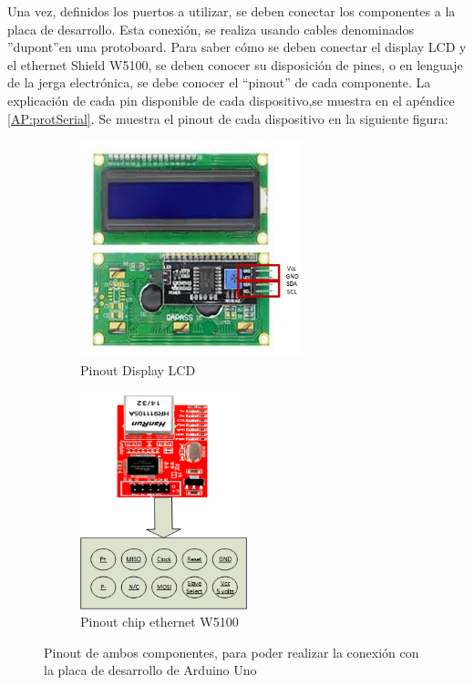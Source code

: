 Una vez, definidos los puertos a utilizar, se deben conectar los componentes a la placa de desarrollo. Esta conexión, se realiza usando cables denominados ''dupont''en una protoboard. 
Para saber cómo se deben conectar el display LCD y el ethernet Shield W5100, se deben conocer su disposición de pines, o en lenguaje de la jerga electrónica, se debe conocer el ``pinout'' de cada componente. La explicación de cada pin disponible de cada dispositivo,se muestra en el apéndice \ref{AP:protSerial}. Se muestra el pinout  de cada dispositivo en la siguiente figura: %

\setlength{\textwidth}{190mm}

\begin{figure}[ht]
	\begin{subfigure}{0.5\textwidth}
		\centering	
		\includegraphics[height=6.3cm]{pinout LCD}
		\caption{Pinout Display LCD }		
	\end{subfigure}
	\hspace{-30mm}
	\begin{subfigure}{0.5\textwidth}		
		\centering
		 
		\includegraphics[height=6.3cm]{pinoutW5100}
		\caption{Pinout chip ethernet W5100}	
	\end{subfigure}
	
	\caption{Pinout de ambos componentes, para poder realizar la conexión con la placa de desarrollo de Arduino Uno}
	\label{fig:pinoutlcdeth}
\end{figure}
\setlength{\textwidth}{150mm}

